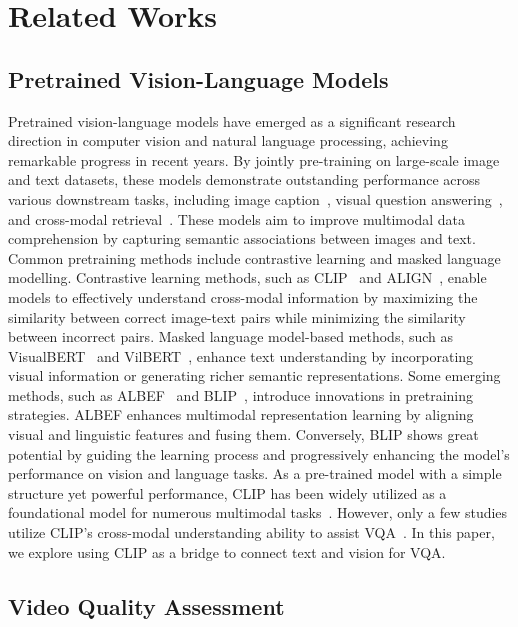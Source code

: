 \section{Related Works}
\subsection{Pretrained Vision-Language Models}

Pretrained vision-language models have emerged as a significant research direction in computer vision and natural language processing, achieving remarkable progress in recent years.
By jointly pre-training on large-scale image and text datasets, these models demonstrate outstanding performance across various downstream tasks, including image caption~\cite{mokady2021clipcap, stefanini2022show, hessel2021clipscore, vinyals2015show}, visual question answering~\cite{pan2023retrieving, song2022clip, antol2015vqa}, and cross-modal retrieval~\cite{xia2023clip, zhen2019deep}.
These models aim to improve multimodal data comprehension by capturing semantic associations between images and text. Common pretraining methods include contrastive learning and masked language modelling.
Contrastive learning methods, such as CLIP~\cite{radford2021learning} and ALIGN~\cite{jia2021scaling}, enable models to effectively understand cross-modal information by maximizing the similarity between correct image-text pairs while minimizing the similarity between incorrect pairs. 
Masked language model-based methods, such as VisualBERT~\cite{li2019visualbert} and VilBERT~\cite{lu2019vilbert}, enhance text understanding by incorporating visual information or generating richer semantic representations.
Some emerging methods, such as ALBEF~\cite{li2021align} and BLIP~\cite{li2022blip}, introduce innovations in pretraining strategies. ALBEF enhances multimodal representation learning by aligning visual and linguistic features and fusing them. Conversely, BLIP shows great potential by guiding the learning process and progressively enhancing the model’s performance on vision and language tasks.
As a pre-trained model with a simple structure yet powerful performance, CLIP has been widely utilized as a foundational model for numerous multimodal tasks~\cite{xia2023clip, song2022clip, mokady2021clipcap}.
However, only a few studies utilize CLIP’s cross-modal understanding ability to assist VQA~\cite{xing2024clipvqa}. In this paper, we explore using CLIP as a bridge to connect text and vision for VQA.


\subsection{Video Quality Assessment}

